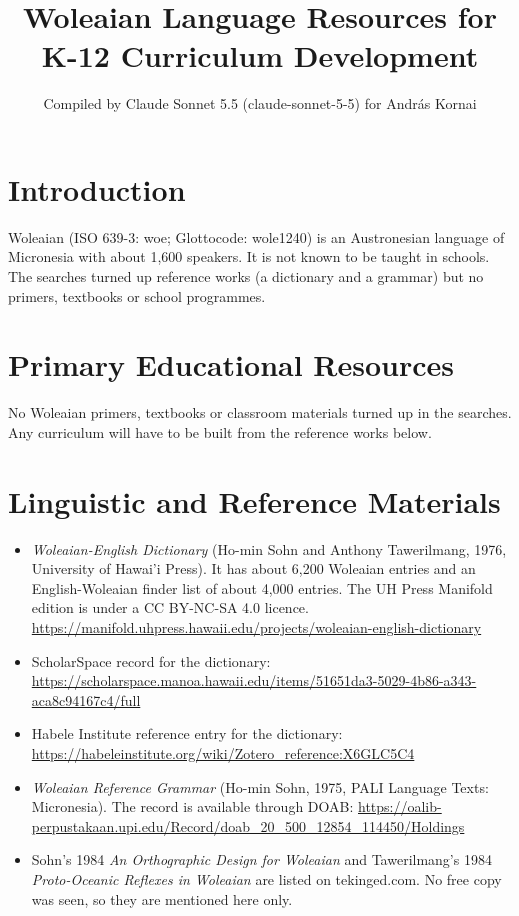 \documentclass[12pt]{article}
\title{Woleaian Language Resources for K-12 Curriculum Development}
\author{Compiled by Claude Sonnet 5.5 (claude-sonnet-5-5) for Andr\'as Kornai}
\date{}
\begin{document}
\maketitle

\section{Introduction}
Woleaian (ISO 639-3: woe; Glottocode: wole1240) is an Austronesian language of Micronesia with about 1,600 speakers. It is not known to be taught in schools. The searches turned up reference works (a dictionary and a grammar) but no primers, textbooks or school programmes.

\section{Primary Educational Resources}
No Woleaian primers, textbooks or classroom materials turned up in the searches. Any curriculum will have to be built from the reference works below.

\section{Linguistic and Reference Materials}
\begin{itemize}
\item \emph{Woleaian-English Dictionary} (Ho-min Sohn and Anthony Tawerilmang, 1976, University of Hawai'i Press). It has about 6,200 Woleaian entries and an English-Woleaian finder list of about 4,000 entries. The UH Press Manifold edition is under a CC BY-NC-SA 4.0 licence. \url{https://manifold.uhpress.hawaii.edu/projects/woleaian-english-dictionary}
\item ScholarSpace record for the dictionary: \url{https://scholarspace.manoa.hawaii.edu/items/51651da3-5029-4b86-a343-aca8c94167c4/full}
\item Habele Institute reference entry for the dictionary: \url{https://habeleinstitute.org/wiki/Zotero_reference:X6GLC5C4}
\item \emph{Woleaian Reference Grammar} (Ho-min Sohn, 1975, PALI Language Texts: Micronesia). The record is available through DOAB: \url{https://oalib-perpustakaan.upi.edu/Record/doab_20_500_12854_114450/Holdings}
\item Sohn's 1984 \emph{An Orthographic Design for Woleaian} and Tawerilmang's 1984 \emph{Proto-Oceanic Reflexes in Woleaian} are listed on tekinged.com. No free copy was seen, so they are mentioned here only.
\end{itemize}
\end{document}
